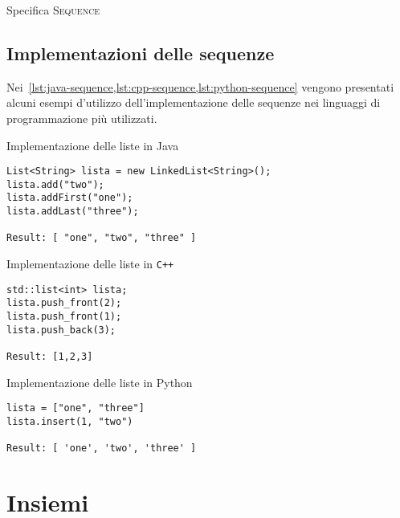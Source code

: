 \begin{algorithm}[H]
	\caption[Specifica sequenza]{Specifica \textsc{Sequence}}
	
\end{algorithm}

\clearpage
\subsection{Implementazioni delle sequenze}

Nei~\cref{lst:java-sequence,lst:cpp-sequence,lst:python-sequence} vengono presentati alcuni esempi d'utilizzo dell'implementazione delle sequenze nei linguaggi di programmazione più utilizzati.

\begin{listing}[H]
\caption{Implementazione delle liste in Java}%
\label{lst:java-sequence}%
\begin{verbatim}
List<String> lista = new LinkedList<String>();
lista.add("two");
lista.addFirst("one");
lista.addLast("three");

Result: [ "one", "two", "three" ]
\end{verbatim}
\end{listing}
\vspace{-25pt}

\begin{listing}[H]
\caption{Implementazione delle liste in \texttt{C++}}%
\label{lst:cpp-sequence}
\begin{verbatim}
std::list<int> lista;
lista.push_front(2);
lista.push_front(1);
lista.push_back(3);

Result: [1,2,3]
\end{verbatim}
\end{listing}
\vspace{-25pt}

\begin{listing}[H]
\caption{Implementazione delle liste in Python}%
\label{lst:python-sequence}
\begin{verbatim}
lista = ["one", "three"]
lista.insert(1, "two")

Result: [ 'one', 'two', 'three' ]
\end{verbatim}
\end{listing}
\vspace{-25pt}

\section{Insiemi}


